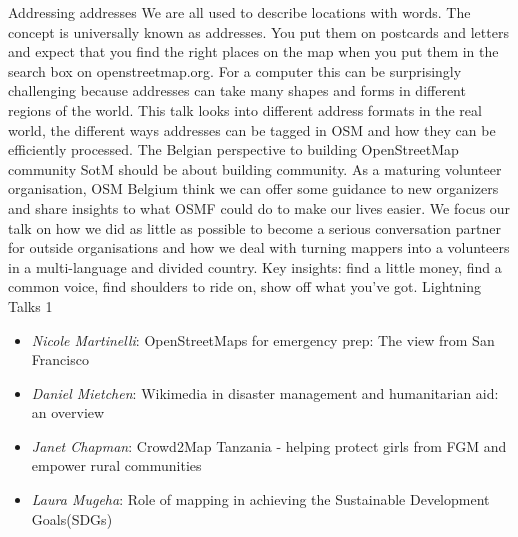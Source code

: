 
%
{Addressing addresses}%
{}%
{%
  We are all used to describe locations with words. The concept is universally known as addresses.
  You put them on postcards and letters and expect that you find the right places on the map when
  you put them in the search box on openstreetmap.org. For a computer this can be surprisingly
  challenging because addresses can take many shapes and forms in different regions of the world.
  This talk looks into different address formats in the real world, the different ways addresses can
  be tagged in OSM and how they can be efficiently processed.%
}
%
{The Belgian perspective to building OpenStreetMap community}%
{}%
{%
  SotM should be about building community. As a maturing volunteer organisation, OSM Belgium think
  we can offer some guidance to new organizers and share insights to what OSMF could do to make our
  lives easier. We focus our talk on how we did as little as possible to become a serious
  conversation partner for outside organisations and how we deal with turning mappers into a
  volunteers in a multi-language and divided country. Key insights: find a little money, find a
  common voice, find shoulders to ride on, show off what you've got.%
}
\abstractFour{}%
{Lightning Talks 1}%
{}%
{%
  \vspace{-2em}
  \begin{itemize}
    \setlength{\itemsep}{0pt}
    \item \emph{Nicole Martinelli}: OpenStreetMaps for emergency prep: The view from San Francisco
    \item \emph{Daniel Mietchen}: Wikimedia in disaster management and humanitarian aid: an overview
    \item \emph{Janet Chapman}: Crowd2Map Tanzania - helping protect girls from FGM and empower
      rural communities
    \item \emph{Laura Mugeha}: Role of mapping in achieving the Sustainable Development Goals(SDGs)
  \end{itemize}
}


